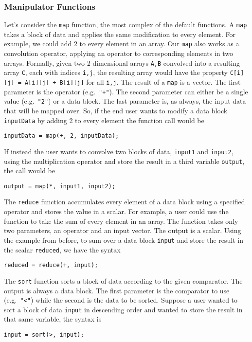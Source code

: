 \documentclass[twocolumn]{article}
\renewcommand{\|}{\origbar} %
\newcommand{\code}[1]{\texttt{#1}}
\begin{document}
\subsubsection{Manipulator Functions}
\label{sec:manipulators}

Let's consider the \code{map} function, the most complex of the default functions. A \code{map} takes a block of data and applies the same modification to every element. For example, we could add 2 to every element in an array. Our \code{map} also works as a convolution operator, applying an operator to corresponding elements in two arrays. Formally, given two 2-dimensional arrays \code{A,B} convolved into a resulting array \code{C}, each with indices \code{i,j}, the resulting array would have the property \code{C[i][j]~=~A[i][j]~+~B[i][j]} for all \code{i,j}. The result of a \code{map} is a vector. The first parameter is the operator (e.g.\ \code{"+"}). The second parameter can either be a single value (e.g.\ \code{"2"}) or a data block. The last parameter is, as always, the input data that will be mapped over. So, if the end user wants to modify a data block \code{inputData} by adding 2 to every element the function call would be
\begin{center}
  \code{inputData = map(+, 2, inputData);}
\end{center}
If instead the user wants to convolve two blocks of data, \code{input1} and \code{input2}, using the multiplication operator and store the result in a third variable \code{output}, the call would be
\begin{center}
  \code{output = map(*, input1, input2);}
\end{center}

The \code{reduce} function accumulates every element of a data block using a specified operator and stores the value in a scalar. For example, a user could use the function to take the sum of every element in an array. The function takes only two parameters, an operator and an input vector. The output is a scalar. Using the example from before, to sum over a data block \code{input} and store the result in the scalar \code{reduced}, we have the syntax
\begin{center}
  \code{reduced = reduce(+, input);}
\end{center}

The \code{sort} function sorts a block of data according to the given comparator. The output is always a data block. The first parameter is the comparator to use (e.g.\ \code{"<"}) while the second is the data to be sorted. Suppose a user wanted to sort a block of data \code{input} in descending order and wanted to store the result in that same variable, the syntax is
\begin{center}
  \code{input = sort(>, input);}
\end{center}
\end{document}
